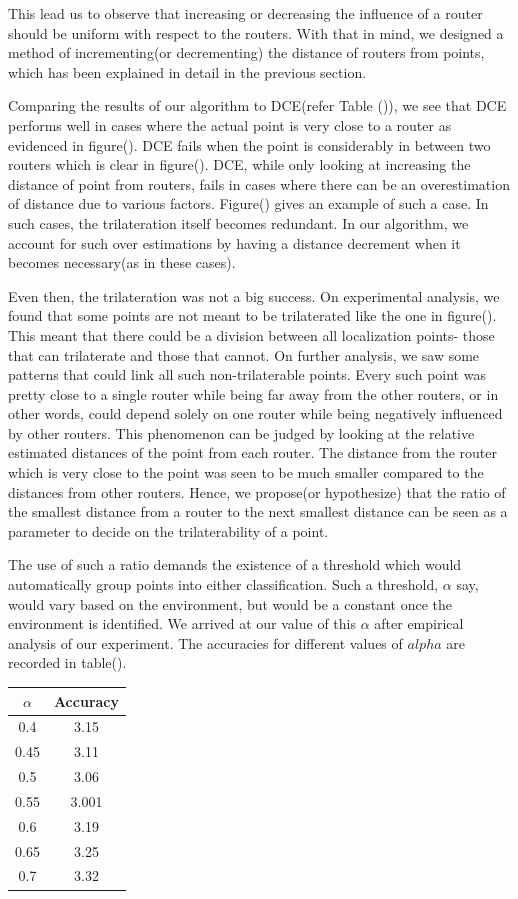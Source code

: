 \documentclass[twocolumn, 11pt]{IEEEtran}
\begin{document}
This lead us to observe that increasing or decreasing the influence of a router should be uniform with respect to the routers. With that in mind, we designed a method of incrementing(or decrementing) the distance of routers from points, which has been explained in detail in the previous section.

Comparing the results of our algorithm to DCE(refer Table ()), we see that DCE performs well in cases where the actual point is very close to a router as evidenced in figure(). DCE fails when the point is considerably in between two routers which is clear in figure(). DCE, while only looking at increasing the distance of point from routers, fails in cases where there can be an overestimation of distance due to various factors. Figure() gives an example of such a case. In such cases, the trilateration itself becomes redundant. In our algorithm, we account for such over estimations by having a distance decrement when it becomes necessary(as in these cases).

Even then, the trilateration was not a big success. On experimental analysis, we found that some points are not meant to be trilaterated like the one in figure().
This meant that there could be a division between all localization points- those that can trilaterate and those that cannot. On further analysis, we saw some patterns that could link all such non-trilaterable points. Every such point was pretty close to a single router while being far away from the other routers, or in other words, could depend solely on one router while being negatively influenced by other routers.
This phenomenon can be judged by looking at the relative estimated distances of the point from each router. The distance from the router which is very close to the point was seen to be much smaller compared to the distances from other routers. Hence, we propose(or hypothesize) that the ratio of the smallest distance from a router to the next smallest distance can be seen as a parameter to decide on the trilaterability of a point. 

The use of such a ratio demands the existence of a threshold which would automatically group points into either classification. Such a threshold, $\alpha$ say, would vary based on the environment, but would be a constant once the environment is identified. We arrived at our value of this $\alpha$ after empirical analysis of our experiment.
The accuracies for different values of $alpha$ are recorded in table().

\begin{center}
\begin{tabular}{ |c|c| } 
\hline
$\alpha$ & Accuracy \\
\hline
0.4  & 3.15 \\
0.45 & 3.11 \\
0.5  & 3.06 \\
0.55 & 3.001 \\
0.6  & 3.19 \\
0.65 & 3.25 \\
0.7  & 3.32  \\
\hline

\end{tabular}
\end{center}
\end{document}
